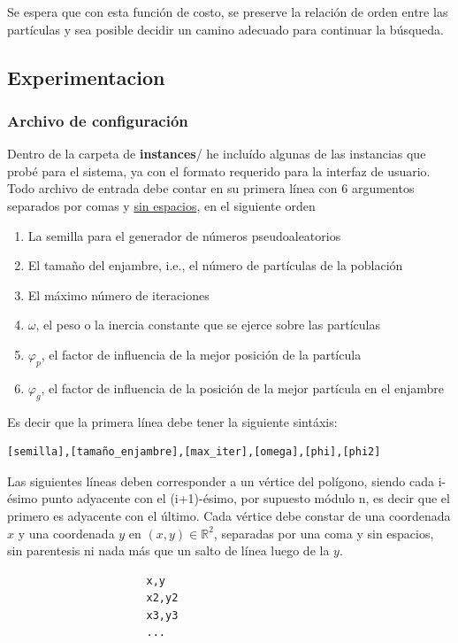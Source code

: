\documentclass[12pt]{article}
\begin{document}
Se espera que con esta función de costo, se preserve la relación de orden entre las partículas y sea
posible decidir un camino adecuado para continuar la búsqueda.

\subsection{Experimentacion}\label{sec:m} %
\subsubsection*{Archivo de configuración}
Dentro de la carpeta de \textbf{instances}/ he incluído algunas de las instancias que probé para el sistema, ya con el formato requerido para la interfaz de usuario. Todo archivo de entrada debe contar
en su primera línea con 6 argumentos separados por comas y \underline{sin espacios}, en el siguiente orden
\begin{enumerate}
\item La semilla para el generador de números pseudoaleatorios
\item El tamaño del enjambre, i.e., el número de partículas de la población
\item El máximo número de iteraciones
\item $\omega$, el peso o la inercia constante que se ejerce sobre las partículas
\item $\varphi_p$, el factor de influencia de la mejor posición de la partícula
\item $\varphi_g$, el factor de influencia de la posición de la mejor partícula en el enjambre
\end{enumerate}
Es decir que la primera línea debe tener la siguiente sintáxis:
\begin{verbatim}
[semilla],[tamaño_enjambre],[max_iter],[omega],[phi],[phi2]
\end{verbatim}

Las siguientes líneas deben corresponder a un vértice del polígono, siendo cada i-ésimo punto adyacente con
el (i+1)-ésimo, por supuesto módulo n, es decir que el primero es adyacente con el último.
Cada vértice debe constar de una coordenada $x$ y una coordenada $y$ en $(x,y) \in \mathbb{R}^2$,
separadas por una coma y sin espacios, sin parentesis ni nada más que un salto de línea luego de la $y$. 

\begin{verbatim}
                      x,y
                      x2,y2
                      x3,y3
                      ...
\end{verbatim}
\end{document}
